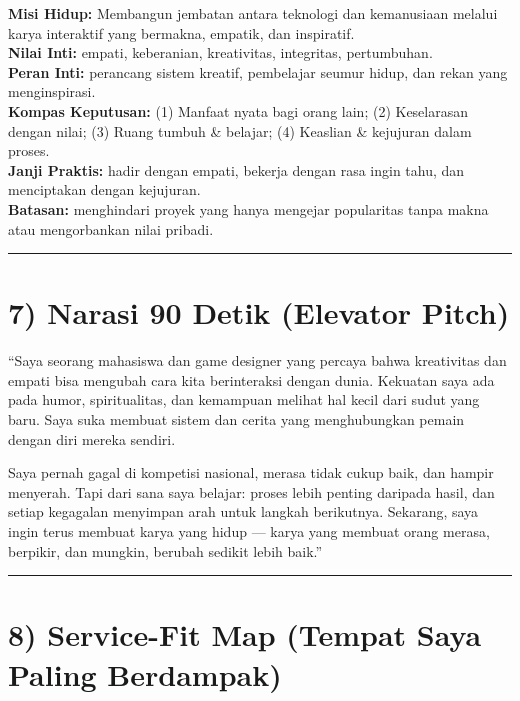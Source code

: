 \documentclass[
  letterpaper,
  DIV=11,
  numbers=noendperiod]{scrreprt}
\begin{document}
\textbf{Misi Hidup:} Membangun jembatan antara teknologi dan kemanusiaan
melalui karya interaktif yang bermakna, empatik, dan inspiratif.\\
\textbf{Nilai Inti:} empati, keberanian, kreativitas, integritas,
pertumbuhan.\\
\textbf{Peran Inti:} perancang sistem kreatif, pembelajar seumur hidup,
dan rekan yang menginspirasi.\\
\textbf{Kompas Keputusan:} (1) Manfaat nyata bagi orang lain; (2)
Keselarasan dengan nilai; (3) Ruang tumbuh \& belajar; (4) Keaslian \&
kejujuran dalam proses.\\
\textbf{Janji Praktis:} hadir dengan empati, bekerja dengan rasa ingin
tahu, dan menciptakan dengan kejujuran.\\
\textbf{Batasan:} menghindari proyek yang hanya mengejar popularitas
tanpa makna atau mengorbankan nilai pribadi.

\begin{center}\rule{0.5\linewidth}{0.5pt}\end{center}

\section{7) Narasi 90 Detik (Elevator
Pitch)}\label{narasi-90-detik-elevator-pitch}

``Saya seorang mahasiswa dan game designer yang percaya bahwa
kreativitas dan empati bisa mengubah cara kita berinteraksi dengan
dunia. Kekuatan saya ada pada humor, spiritualitas, dan kemampuan
melihat hal kecil dari sudut yang baru. Saya suka membuat sistem dan
cerita yang menghubungkan pemain dengan diri mereka sendiri.

Saya pernah gagal di kompetisi nasional, merasa tidak cukup baik, dan
hampir menyerah. Tapi dari sana saya belajar: proses lebih penting
daripada hasil, dan setiap kegagalan menyimpan arah untuk langkah
berikutnya. Sekarang, saya ingin terus membuat karya yang hidup ---
karya yang membuat orang merasa, berpikir, dan mungkin, berubah sedikit
lebih baik.''

\begin{center}\rule{0.5\linewidth}{0.5pt}\end{center}

\section{8) Service-Fit Map (Tempat Saya Paling
Berdampak)}\label{service-fit-map-tempat-saya-paling-berdampak}
\end{document}
